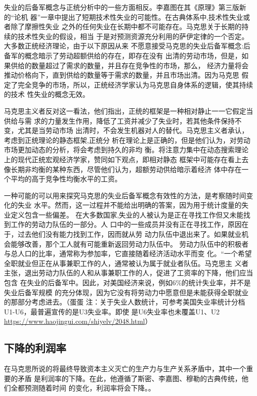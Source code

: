 失业的后备军概念与正统分析中的一些方面相反。李嘉图在其《原理》第三版新的“论机
器”一章中提出了短期技术性失业的可能性。在古典体系中,技术性失业或者除了摩擦性失业
之外的任何失业在长期中都不可能存在。马克思关于长期的持续的技术性失业的假设，相当
于是对预测资源充分利用的萨伊定律的一个否定。大多数正统经济理论，由于以下原因从来
不愿意接受马克思的失业后备军概念:后备军的概念暗示了劳动超额供给的存在，即存在没有
出清的劳动市场，但是，如果供给的数量超过了需求的数量，并且存在竞争性的市场，那么，
经济力量将会推动价格向下，直到供给的数量等于需求的数量，并且市场出清。因为马克思
假定了完全竞争的市场，所以，正统经济学家认为马克思自身体系的逻辑，使其持续的技术
性失业的概念无效。

马克思主义者反对这一看法，他们指出，正统的框架是一种相对静止一一它假定当供给与需
求的力量发生作用，降低了工资并减少了失业时，若其他条件保持不变，尤其是当劳动市场
出清时，不会发生机器对人的替代。马克思主义者承认，考虑到正统理论的静态框架,正统分
析在理论上是正确的，但是他们认为，对劳动市场更加动态的分析，将会考虑到持久的非均
衡。将注意力集中在动态搜索理论上的现代正统宏观经济学家，赞同如下观点，即相对静态
框架中可能存在看上去像长期非均衡的某种东西，尽管他们认为，超额劳动供给暗示着经济
体中存在一个平均的高于竞争性均衡水平的工资。

一种可能的可以用来探究马克思的失业后备军概念有效性的方法，是考察随时间变化的失业
水平。然而，这一过程并不能给出明确的答案，因为用于统计度量的失业定义包含一些偏差。
在大多数国家,失业的人被认为是正在寻找工作但又未能找到工作的劳动力队伍的一部分。人
口中的一些成员并没有正在寻找工作，原因在于，过去他们没有能力找到工作，因而就从劳
动力队伍中退出来了。如果就业机会能够改善，那个工人就有可能重新返回劳动力队伍中。
劳动力队伍中的积极者与总人口的比率，通常称为参加率，它直接随着经济活动水平而变
化。“一个希望全职就业但正在从事兼职工作的人，通常被认为属于就业者队伍。马克思主
义者主张，退出劳动力队伍的人和从事兼职工作的人，促进了工资率的下降，他们应当包含
在失业的后备军中。因此，对美国经济来说，例如6\%的统计失业率，并不是失业后备军规模
的充分体现，因为它没有将劳动力中愿意但是未能获得全职就业的那部分考虑进去。（蛋蛋
注：关于失业人数统计，可参考美国失业率统计分档U1-U6，最普遍宣传的是U3失业率。即使
是U6失业率也未覆盖U1、U2 \url{https://www.haojingui.com/shiyelv/2048.html}）


\subsection{下降的利润率}

在马克思所说的将最终导致资本主义灭亡的生产力与生产关系矛盾中，其中一个重要的矛盾
是利润率的下降。在此，他遵循了斯密、李嘉图、穆勒的古典传统，他们全都预测随着时间
的变化，利润率将会下降。。


